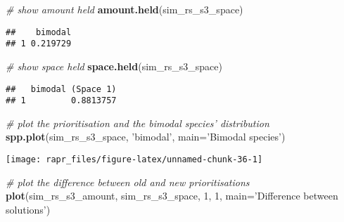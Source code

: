 \documentclass[11pt,]{article}
\newenvironment{Shaded}{\begin{snugshade}}{\end{snugshade}}
\newcommand{\KeywordTok}[1]{\textcolor[rgb]{0.13,0.29,0.53}{\textbf{{#1}}}}
\newcommand{\DataTypeTok}[1]{\textcolor[rgb]{0.13,0.29,0.53}{{#1}}}
\newcommand{\DecValTok}[1]{\textcolor[rgb]{0.00,0.00,0.81}{{#1}}}
\newcommand{\StringTok}[1]{\textcolor[rgb]{0.31,0.60,0.02}{{#1}}}
\newcommand{\CommentTok}[1]{\textcolor[rgb]{0.56,0.35,0.01}{\textit{{#1}}}}
\newcommand{\NormalTok}[1]{{#1}}
\let\origfigure\figure
\let\endorigfigure\endfigure
\renewenvironment{figure}[1][2] {
	\expandafter\origfigure\expandafter[H]
} {
	\endorigfigure
}
\begin{document}
\begin{Shaded}
\begin{Highlighting}[]
\CommentTok{# show amount held}
\KeywordTok{amount.held}\NormalTok{(sim_rs_s3_space)}
\end{Highlighting}
\end{Shaded}

\begin{verbatim}
##    bimodal
## 1 0.219729
\end{verbatim}

\begin{Shaded}
\begin{Highlighting}[]
\CommentTok{# show space held}
\KeywordTok{space.held}\NormalTok{(sim_rs_s3_space)}
\end{Highlighting}
\end{Shaded}

\begin{verbatim}
##   bimodal (Space 1)
## 1         0.8813757
\end{verbatim}

\begin{Shaded}
\begin{Highlighting}[]
\CommentTok{# plot the prioritisation and the bimodal species' distribution}
\KeywordTok{spp.plot}\NormalTok{(sim_rs_s3_space, }\StringTok{'bimodal'}\NormalTok{, }\DataTypeTok{main=}\StringTok{'Bimodal species'}\NormalTok{)}
\end{Highlighting}
\end{Shaded}

\begin{figure}

{\centering \texttt{[image: rapr\_files/figure-latex/unnamed-chunk-36-1]} 

}

\caption{A prioritisation for the normally distributed species generated using amount-based targets (20\%) and space-based targets (85\%). See Figure 3 caption for conventions.}\label{fig:unnamed-chunk-36}
\end{figure}

\begin{Shaded}
\begin{Highlighting}[]
\CommentTok{# plot the difference between old and new prioritisations}
\KeywordTok{plot}\NormalTok{(sim_rs_s3_amount, sim_rs_s3_space, }\DecValTok{1}\NormalTok{, }\DecValTok{1}\NormalTok{, }\DataTypeTok{main=}\StringTok{'Difference between solutions'}\NormalTok{)}
\end{Highlighting}
\end{Shaded}
\end{document}
